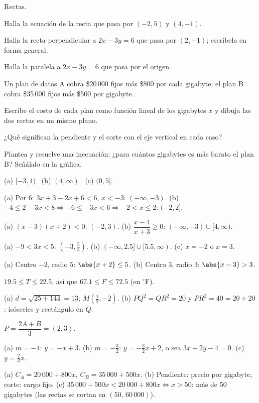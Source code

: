 \documentclass[11pt,a4paper]{article}
\begin{document}
\begin{ejercicios}
\item Rectas.
  \begin{ejercicios}
  \item Halla la ecuación de la recta que pasa por $(-2,5)$ y $(4,-1)$.
  \item Halla la recta perpendicular a $2x-3y=6$ que pasa por $(2,-1)$; escríbela en forma general.
  \item Halla la paralela a $2x-3y=6$ que pasa por el origen.
  \end{ejercicios}
\item Un plan de datos A cobra \$20\,000 fijos más \$800 por cada gigabyte; el plan B cobra \$35\,000 fijos más \$500 por gigabyte.
  \begin{ejercicios}
  \item Escribe el costo de cada plan como función lineal de los gigabytes $x$ y dibuja las dos rectas en un mismo plano.
  \item ¿Qué significan la pendiente y el corte con el eje vertical en cada caso?
  \item Plantea y resuelve una inecuación: ¿para cuántos gigabytes es más barato el plan B? Señálalo en la gráfica.
  \end{ejercicios}
\end{ejercicios}

\respuestas
\begin{respuestascortas}
\begin{soluciones}
\item (a) $[-3,1)$ \ (b) $(4,\infty)$ \ (c) $(0,5]$.
\item (a) Por $6$: $3x+3-2x+6<6$, $x<-3$: $(-\infty,-3)$. (b) $-4\le 2-3x<8\Rightarrow -6\le -3x<6\Rightarrow -2<x\le 2$: $(-2,2]$.
\item (a) $(x-3)(x+2)<0$: $(-2,3)$. (b) $\dfrac{x-4}{x+3}\ge 0$: $(-\infty,-3)\cup[4,\infty)$.
\item (a) $-9<3x<5$: $\left(-3,\tfrac53\right)$. (b) $(-\infty,2.5]\cup[5.5,\infty)$. (c) $x=-2$ o $x=3$.
\item (a) Centro $-2$, radio $5$: $\abs{x+2}\le 5$. (b) Centro $3$, radio $3$: $\abs{x-3}>3$.
\item $19.5\le T\le 22.5$, así que $67.1\le F\le 72.5$ (en ${}^\circ$F).
\item (a) $d=\sqrt{25+144}=13$; $M\left(\tfrac12,-2\right)$. (b) $PQ^2=QR^2=20$ y $PR^2=40=20+20$: isósceles y rectángulo en $Q$.
\item $P=\dfrac{2A+B}{3}=(2,3)$.
\item (a) $m=-1$: $y=-x+3$. (b) $m=-\tfrac32$: $y=-\tfrac32x+2$, o sea $3x+2y-4=0$. (c) $y=\tfrac23x$.
\item (a) $C_A=20\,000+800x$, $C_B=35\,000+500x$. (b) Pendiente: precio por gigabyte; corte: cargo fijo. (c) $35\,000+500x<20\,000+800x\iff x>50$: más de $50$ gigabytes (las rectas se cortan en $(50,\,60\,000)$).
\end{soluciones}
\end{respuestascortas}
\end{document}
